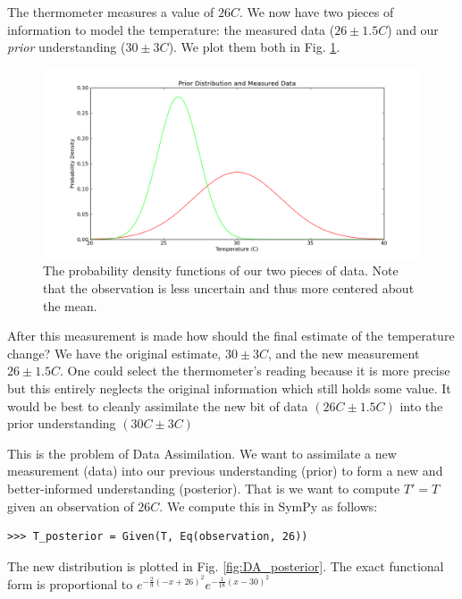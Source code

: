 The thermometer measures a value of $26C$. We now have two pieces of
information to model the temperature: the measured data ($26\pm1.5C$) and our \textit{prior}
understanding ($30\pm3C$). We plot them both in Fig. \ref{fig:DA_data}.

\begin{figure}[ht]
\vspace{-0pt}
\centering
\includegraphics[width=.7\textwidth]{images/data.png}
\vspace{-0pt}
\caption{The probability density functions of our two pieces of data. Note that the observation is less uncertain and thus more centered about the mean.}
\label{fig:DA_data}
\vspace{00pt}
\end{figure}

After this measurement is made how should the final estimate of the temperature change? We have the original estimate, $30 \pm 3C$, and the new measurement $26 \pm 1.5C$. One could select the thermometer's reading because it is more precise but this entirely neglects the original information which still holds some value. It would be best to cleanly assimilate the new bit of data $(26C \pm 1.5C)$ into the prior understanding $(30C \pm 3C)$

This is the problem of Data Assimilation. We want to assimilate a new
measurement (data) into our previous understanding (prior) to form a new and
better-informed understanding (posterior). That is we want to compute $T' = T$
given an observation of $26C$. We compute this in SymPy as follows:

\begin{lstlisting}
>>> T_posterior = Given(T, Eq(observation, 26))
\end{lstlisting}

The new distribution is plotted in Fig. \ref{fig:DA_posterior}. The exact
functional form is proportional to $e^{-\frac{2}{9} \left(-x + 26\right)^{2}}
e^{-\frac{1}{18} \left(x-30\right)^{2}}$


